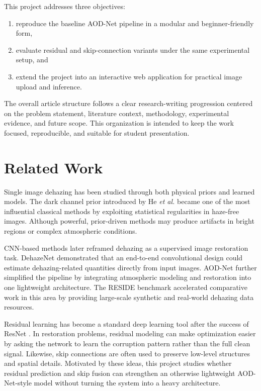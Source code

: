 \documentclass[conference]{IEEEtran}
\begin{document}
This project addresses three objectives:
\begin{enumerate}
    \item reproduce the baseline AOD-Net pipeline in a modular and beginner-friendly form,
    \item evaluate residual and skip-connection variants under the same experimental setup, and
    \item extend the project into an interactive web application for practical image upload and inference.
\end{enumerate}

The overall article structure follows a clear research-writing progression centered on the problem statement, literature context, methodology, experimental evidence, and future scope. This organization is intended to keep the work focused, reproducible, and suitable for student presentation.

\section{Related Work}
Single image dehazing has been studied through both physical priors and learned models. The dark channel prior introduced by He \emph{et al.} \cite{he2009darkchannel} became one of the most influential classical methods by exploiting statistical regularities in haze-free images. Although powerful, prior-driven methods may produce artifacts in bright regions or complex atmospheric conditions.

CNN-based methods later reframed dehazing as a supervised image restoration task. DehazeNet \cite{cai2016dehazenet} demonstrated that an end-to-end convolutional design could estimate dehazing-related quantities directly from input images. AOD-Net \cite{li2017aodnet} further simplified the pipeline by integrating atmospheric modeling and restoration into one lightweight architecture. The RESIDE benchmark \cite{li2018reside} accelerated comparative work in this area by providing large-scale synthetic and real-world dehazing data resources.

Residual learning has become a standard deep learning tool after the success of ResNet \cite{he2016resnet}. In restoration problems, residual modeling can make optimization easier by asking the network to learn the corruption pattern rather than the full clean signal. Likewise, skip connections are often used to preserve low-level structures and spatial details. Motivated by these ideas, this project studies whether residual prediction and skip fusion can strengthen an otherwise lightweight AOD-Net-style model without turning the system into a heavy architecture.
\end{document}
